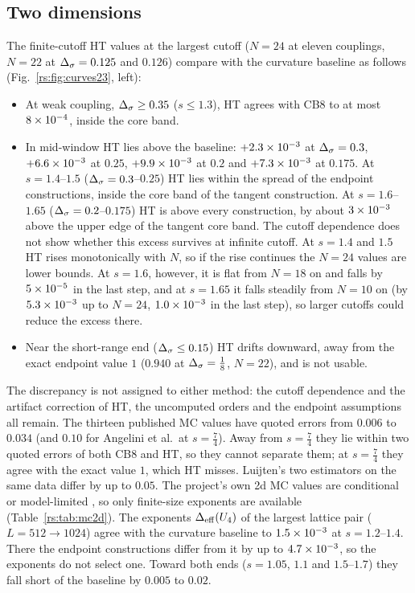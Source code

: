 \subsection{Two dimensions}
The finite-cutoff HT values \cite{rs:noteHT} at the largest cutoff ($N=24$ at eleven couplings,
$N=22$ at $\Delta_\sigma=0.125$ and $0.126$) compare with the curvature baseline as follows
(Fig.~\ref{rs:fig:curves23}, left):
\begin{itemize}
\item At weak coupling, $\Delta_\sigma\ge0.35$ ($s\le1.3$), HT agrees with CB8 to at most
$8\times10^{-4}$, inside the core band.
\item In mid-window HT lies above the baseline: $+2.3\times10^{-3}$ at $\Delta_\sigma=0.3$,
$+6.6\times10^{-3}$ at $0.25$, $+9.9\times10^{-3}$ at $0.2$ and $+7.3\times10^{-3}$ at $0.175$.
At $s=1.4$--$1.5$ ($\Delta_\sigma=0.3$--$0.25$) HT lies within the spread of the endpoint
constructions, inside the core band of the tangent construction. At $s=1.6$--$1.65$
($\Delta_\sigma=0.2$--$0.175$) HT is above every construction, by about $3\times10^{-3}$ above the upper
edge of the tangent core band. The cutoff dependence does not show whether this excess
survives at infinite cutoff. At $s=1.4$ and $1.5$ HT rises monotonically with $N$, so if the
rise continues the $N=24$ values are lower bounds. At $s=1.6$, however, it is flat from $N=18$
on and falls by $5\times10^{-5}$ in the last step, and at $s=1.65$ it falls steadily from $N=10$
on (by $5.3\times10^{-3}$ up to $N=24$, $1.0\times10^{-3}$ in the last step), so larger cutoffs could
reduce the excess there.
\item Near the short-range end ($\Delta_\sigma\le0.15$) HT drifts downward, away from the exact
endpoint value $1$ ($0.940$ at $\Delta_\sigma=\frac18$, $N=22$), and is not usable.
\end{itemize}
The discrepancy is not assigned to either method: the cutoff dependence and the artifact
correction of HT, the uncomputed orders and the endpoint assumptions all remain. The
thirteen published MC values have quoted errors from $0.006$ to $0.034$ (and $0.10$ for
Angelini et al.\ at $s=\frac74$). Away from $s=\frac74$ they lie within two quoted errors of
both CB8 and HT, so they cannot separate them; at $s=\frac74$ they agree with the exact value
$1$, which HT misses. Luijten's two estimators on the same data differ by up to $0.05$. The
project's own 2d MC values are conditional or model-limited \cite{rs:noteMC}, so only
finite-size exponents are available (Table~\ref{rs:tab:mc2d}). The exponents
$\Delta_{\rm eff}(U_4)$ of the largest lattice pair ($L=512\to1024$) agree with the curvature
baseline to $1.5\times10^{-3}$ at $s=1.2$--$1.4$. There the endpoint constructions differ from it
by up to $4.7\times10^{-3}$, so the exponents do not select one. Toward both ends ($s=1.05$,
$1.1$ and $1.5$--$1.7$) they fall short of the baseline by $0.005$ to $0.02$.

